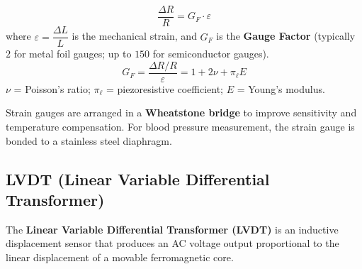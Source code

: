 \documentclass[12pt,a4paper]{article}
\begin{document}
\begin{tcolorbox}[formulabox, title={\textbf{Strain Gauge Formula}}]
\[
\frac{\Delta R}{R} = G_F \cdot \varepsilon
\]
where $\varepsilon = \dfrac{\Delta L}{L}$ is the mechanical strain, and $G_F$ is the \textbf{Gauge Factor} (typically $2$ for metal foil gauges; up to $150$ for semiconductor gauges).
\[
G_F = \frac{\Delta R/R}{\varepsilon} = 1 + 2\nu + \pi_\ell E
\]
$\nu$ = Poisson's ratio; $\pi_\ell$ = piezoresistive coefficient; $E$ = Young's modulus.
\end{tcolorbox}

Strain gauges are arranged in a \textbf{Wheatstone bridge} to improve sensitivity and temperature compensation. For blood pressure measurement, the strain gauge is bonded to a stainless steel diaphragm.

\subsection{LVDT (Linear Variable Differential Transformer)}

\begin{tcolorbox}[defbox, title={\textbf{LVDT}}]
The \textbf{Linear Variable Differential Transformer (LVDT)} is an inductive displacement sensor that produces an AC voltage output proportional to the linear displacement of a movable ferromagnetic core.
\end{tcolorbox}
\end{document}
